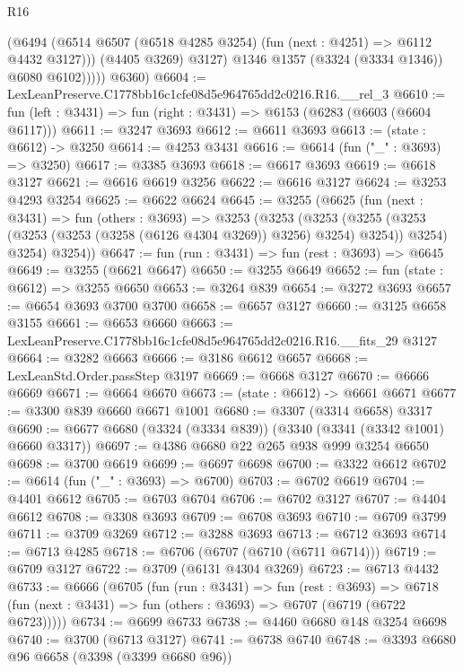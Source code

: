 \begin{lexlean}{R16}
\begin{coremodule}
                  (@6494
                    (@6514 @6507 (@6518 @4285 @3254) (fun (next : @4251) => @6112 @4432 @3127)))
                  (@4405 @3269)
                  @3127)
                @1346
                @1357
                (@3324 (@3334 @1346))
                @6080
                @6102)))))
      @6360)
@6604 := LexLeanPreserve.C1778bb16c1cfe08d5e964765dd2c0216.R16.__rel_3
@6610 := fun (left : @3431) => fun (right : @3431) => @6153 (@6283 (@6603 (@6604 @6117)))
@6611 := @3247 @3693
@6612 := @6611 @3693
@6613 := (state : @6612) -> @3250
@6614 := @4253 @3431
@6616 := @6614 (fun ("_" : @3693) => @3250)
@6617 := @3385 @3693
@6618 := @6617 @3693
@6619 := @6618 @3127
@6621 := @6616 @6619 @3256
@6622 := @6616 @3127
@6624 := @3253 @4293 @3254
@6625 := @6622 @6624
@6645 := @3255
    (@6625
      (fun (next : @3431) =>
      fun (others : @3693) =>
      @3253
        (@3253
          (@3253
            (@3255 (@3253 (@3253 (@3253 (@3258 (@6126 @4304 @3269)) @3256) @3254) @3254))
            @3254)
          @3254)
        @3254))
@6647 := fun (run : @3431) => fun (rest : @3693) => @6645
@6649 := @3255 (@6621 @6647)
@6650 := @3255 @6649
@6652 := fun (state : @6612) => @3255 @6650
@6653 := @3264 @839
@6654 := @3272 @3693
@6657 := @6654 @3693 @3700 @3700
@6658 := @6657 @3127
@6660 := @3125 @6658 @3155
@6661 := @6653 @6660
@6663 := LexLeanPreserve.C1778bb16c1cfe08d5e964765dd2c0216.R16.__fits_29 @3127
@6664 := @3282 @6663
@6666 := @3186 @6612 @6657
@6668 := LexLeanStd.Order.passStep @3197
@6669 := @6668 @3127
@6670 := @6666 @6669
@6671 := @6664 @6670
@6673 := (state : @6612) -> @6661 @6671
@6677 := @3300 @839 @6660 @6671 @1001
@6680 := @3307 (@3314 @6658) @3317
@6690 := @6677 @6680 (@3324 (@3334 @839)) (@3340 (@3341 (@3342 @1001) @6660 @3317))
@6697 := @4386 @6680 @22 @265 @938 @999 @3254 @6650
@6698 := @3700 @6619
@6699 := @6697 @6698
@6700 := @3322 @6612
@6702 := @6614 (fun ("_" : @3693) => @6700)
@6703 := @6702 @6619
@6704 := @4401 @6612
@6705 := @6703 @6704
@6706 := @6702 @3127
@6707 := @4404 @6612
@6708 := @3308 @3693
@6709 := @6708 @3693
@6710 := @6709 @3799
@6711 := @3709 @3269
@6712 := @3288 @3693
@6713 := @6712 @3693
@6714 := @6713 @4285
@6718 := @6706 (@6707 (@6710 (@6711 @6714)))
@6719 := @6709 @3127
@6722 := @3709 (@6131 @4304 @3269)
@6723 := @6713 @4432
@6733 := @6666
    (@6705
      (fun (run : @3431) =>
      fun (rest : @3693) =>
      @6718 (fun (next : @3431) => fun (others : @3693) => @6707 (@6719 (@6722 @6723)))))
@6734 := @6699 @6733
@6738 := @4460 @6680 @148 @3254 @6698
@6740 := @3700 (@6713 @3127)
@6741 := @6738 @6740
@6748 := @3393 @6680 @96 @6658 (@3398 (@3399 @6680 @96))

\end{coremodule}
\end{lexlean}
